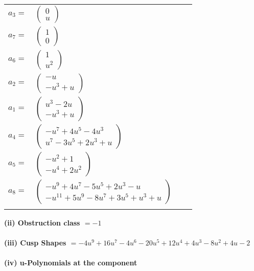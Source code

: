 \documentclass[1p]{elsarticle_modified}
\theoremstyle{definition}
\begin{document}
\begin{tabular}{m{7pt} m{180pt} m{7pt} m{180pt} }
\flushright $a_{3}=$&$\begin{pmatrix}0\\u\end{pmatrix}$ \\
\flushright $a_{7}=$&$\begin{pmatrix}1\\0\end{pmatrix}$ \\
\flushright $a_{6}=$&$\begin{pmatrix}1\\u^2\end{pmatrix}$ \\
\flushright $a_{2}=$&$\begin{pmatrix}- u\\- u^3+u\end{pmatrix}$ \\
\flushright $a_{1}=$&$\begin{pmatrix}u^3-2 u\\- u^3+u\end{pmatrix}$ \\
\flushright $a_{4}=$&$\begin{pmatrix}- u^7+4 u^5-4 u^3\\u^7-3 u^5+2 u^3+u\end{pmatrix}$ \\
\flushright $a_{5}=$&$\begin{pmatrix}- u^2+1\\- u^4+2 u^2\end{pmatrix}$ \\
\flushright $a_{8}=$&$\begin{pmatrix}- u^9+4 u^7-5 u^5+2 u^3- u\\- u^{11}+5 u^9-8 u^7+3 u^5+u^3+u\end{pmatrix}$\\&\end{tabular}
\flushleft \textbf{(ii) Obstruction class $= -1$}\\~\\
\flushleft \textbf{(iii) Cusp Shapes $= -4 u^9+16 u^7-4 u^6-20 u^5+12 u^4+4 u^3-8 u^2+4 u-2$}\\~\\
\newpage\renewcommand{\arraystretch}{1}
\flushleft \textbf{(iv) u-Polynomials at the component}\newline \\
\end{document}
